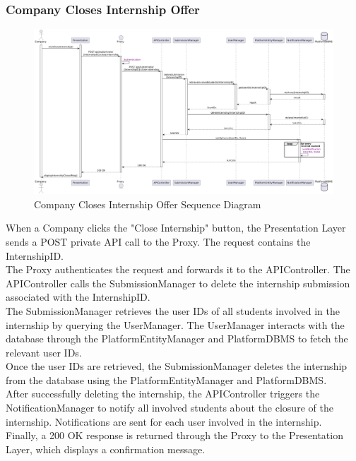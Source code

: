 \subsubsection*{Company Closes Internship Offer}
\begin{figure}[H]
    \centering
    \includegraphics[width=\linewidth]{Latex/Images/DD/SequenceDiagrams/24CompanyClosesInternshipOffer.png}
    \caption{Company Closes Internship Offer Sequence Diagram}
    \label{fig:compclosintoffer}
\end{figure}
When a Company clicks the "Close Internship" button, the Presentation Layer sends a POST private API call to the Proxy. The request contains the InternshipID.\\
The Proxy authenticates the request and forwards it to the APIController. The APIController calls the SubmissionManager to delete the internship submission associated with the InternshipID.\\
The SubmissionManager retrieves the user IDs of all students involved in the internship by querying the UserManager. The UserManager interacts with the database through the PlatformEntityManager and PlatformDBMS to fetch the relevant user IDs.\\
Once the user IDs are retrieved, the SubmissionManager deletes the internship from the database using the PlatformEntityManager and PlatformDBMS.\\
After successfully deleting the internship, the APIController triggers the NotificationManager to notify all involved students about the closure of the internship. Notifications are sent for each user involved in the internship.\\
Finally, a 200 OK response is returned through the Proxy to the Presentation Layer, which displays a confirmation message.


